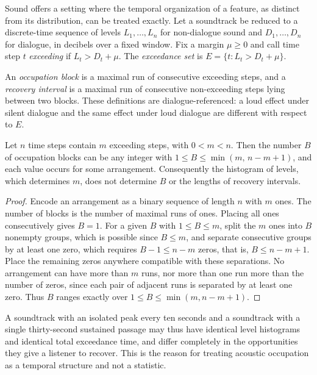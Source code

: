 Sound offers a setting where the temporal organization of a feature, as distinct from its distribution, can be treated exactly. Let a soundtrack be reduced to a discrete-time sequence of levels $L_1,\dots,L_n$ for non-dialogue sound and $D_1,\dots,D_n$ for dialogue, in decibels over a fixed window. Fix a margin $\mu\ge0$ and call time step $t$ \emph{exceeding} if $L_t>D_t+\mu$. The \emph{exceedance set} is $E=\{t:L_t>D_t+\mu\}$.

An \emph{occupation block} is a maximal run of consecutive exceeding steps, and a \emph{recovery interval} is a maximal run of consecutive non-exceeding steps lying between two blocks. These definitions are dialogue-referenced: a loud effect under silent dialogue and the same effect under loud dialogue are different with respect to $E$.

\begin{proposition}\label{prop:arrangement}
Let $n$ time steps contain $m$ exceeding steps, with $0<m<n$. Then the number $B$ of occupation blocks can be any integer with $1\le B\le\min(m,\,n-m+1)$, and each value occurs for some arrangement. Consequently the histogram of levels, which determines $m$, does not determine $B$ or the lengths of recovery intervals.
\end{proposition}

\begin{proof}
Encode an arrangement as a binary sequence of length $n$ with $m$ ones. The number of blocks is the number of maximal runs of ones. Placing all ones consecutively gives $B=1$. For a given $B$ with $1\le B\le m$, split the $m$ ones into $B$ nonempty groups, which is possible since $B\le m$, and separate consecutive groups by at least one zero, which requires $B-1\le n-m$ zeros, that is, $B\le n-m+1$. Place the remaining zeros anywhere compatible with these separations. No arrangement can have more than $m$ runs, nor more than one run more than the number of zeros, since each pair of adjacent runs is separated by at least one zero. Thus $B$ ranges exactly over $1\le B\le\min(m,n-m+1)$.
\end{proof}

A soundtrack with an isolated peak every ten seconds and a soundtrack with a single thirty-second sustained passage may thus have identical level histograms and identical total exceedance time, and differ completely in the opportunities they give a listener to recover. This is the reason for treating acoustic occupation as a temporal structure and not a statistic.

